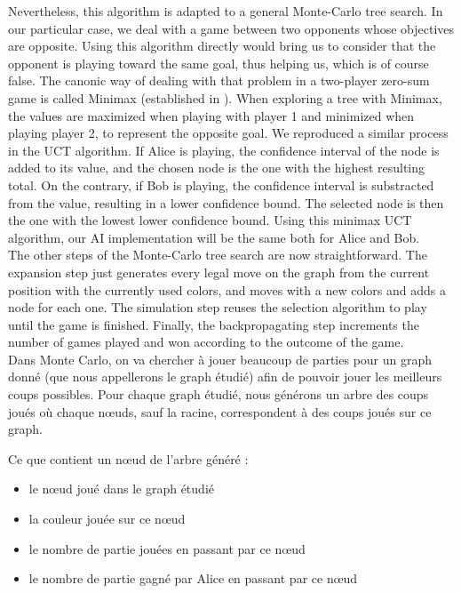 Nevertheless, this algorithm is adapted to a general Monte-Carlo tree search. In our particular case, we deal with a game between two opponents whose objectives are opposite. Using this algorithm directly would bring us to consider that the opponent is playing toward the same goal, thus helping us, which is of course false. The canonic way of dealing with that problem in a two-player zero-sum game is called Minimax (established in \cite{Minimax}). When exploring a tree with Minimax, the values are maximized when playing with player 1 and minimized when playing player 2, to represent the opposite goal. We reproduced a similar process in the UCT algorithm. If Alice is playing, the confidence interval of the node is added to its value, and the chosen node is the one with the highest resulting total. On the contrary, if Bob is playing, the confidence interval is substracted from the value, resulting in a lower confidence bound. The selected node is then the one with the lowest lower confidence bound.
Using this minimax UCT algorithm, our AI implementation will be the same both for Alice and Bob.\\

The other steps of the Monte-Carlo tree search are now straightforward. The expansion step just generates every legal move on the graph from the current position with the currently used colors, and moves with a new colors and adds a node for each one. The simulation step reuses the selection algorithm to play until the game is finished. Finally, the backpropagating step increments the number of games played and won according to the outcome of the game.\\

Dans Monte Carlo, on va chercher à jouer beaucoup de parties pour un graph donné (que nous appellerons le graph étudié) afin de pouvoir jouer les meilleurs coups possibles. 
Pour chaque graph étudié, nous générons un arbre des coups joués où chaque nœuds, sauf la racine, correspondent à des coups joués sur ce graph. 

Ce que contient un nœud de l’arbre généré : 
\begin{itemize}
\item le nœud joué dans le graph étudié
\item la couleur jouée sur ce nœud 
\item le nombre de partie jouées en passant par ce nœud 
\item le nombre de partie gagné par Alice en passant par ce nœud
\end{itemize}

